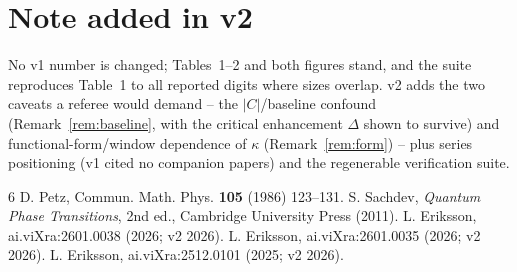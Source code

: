 \documentclass[11pt]{article}
\theoremstyle{remark}
\begin{document}
\section*{Note added in v2}
No v1 number is changed; Tables~1--2 and both figures stand, and the
suite reproduces Table~1 to all reported digits where sizes overlap. v2
adds the two caveats a referee would demand -- the $|C|$/baseline
confound (Remark~\ref{rem:baseline}, with the critical enhancement
$\Delta$ shown to survive) and functional-form/window dependence of
$\kappa$ (Remark~\ref{rem:form}) -- plus series positioning (v1 cited no
companion papers) and the regenerable verification suite.

\begin{thebibliography}{6}
 D. Petz, Commun. Math. Phys. \textbf{105} (1986)
123--131.
 S. Sachdev, \emph{Quantum Phase Transitions}, 2nd ed.,
Cambridge University Press (2011).
 L. Eriksson, ai.viXra:2601.0038 (2026; v2 2026).
 L. Eriksson, ai.viXra:2601.0035 (2026; v2 2026).
 L. Eriksson, ai.viXra:2512.0101 (2025; v2 2026).
\end{thebibliography}
\end{document}
